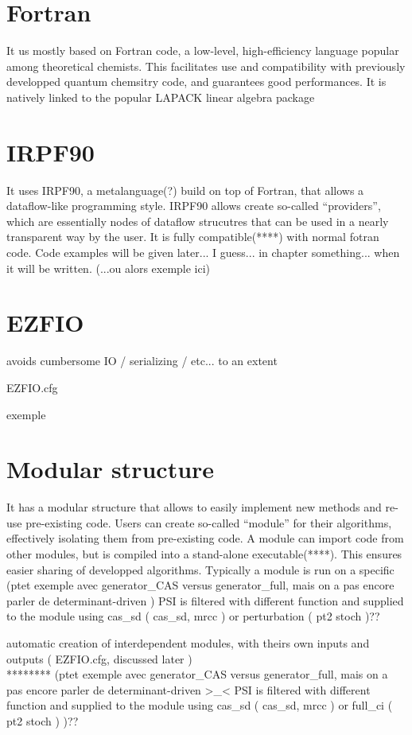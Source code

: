 \documentclass[./thesis.tex]{subfiles}
\begin{document}
\section{Fortran}
It us mostly based on Fortran code, a low-level, high-efficiency language popular among theoretical chemists. This facilitates use and compatibility with previously developped quantum chemsitry code, and guarantees good performances. It is natively linked to the popular LAPACK linear algebra package

\section{IRPF90}
It uses IRPF90, a metalanguage(?) build on top of Fortran, that allows a dataflow-like programming style.
IRPF90 allows create so-called ``providers'', which are essentially nodes of dataflow strucutres that can be used in a nearly transparent way by the user. It is fully compatible(****) with normal fotran code. Code examples will be given later... I guess... in chapter something... when it will be written.
(...ou alors exemple ici)


\section{EZFIO}


avoids cumbersome IO / serializing / etc... to an extent

EZFIO.cfg

exemple

\section{Modular structure}

It has a modular structure that allows to easily implement new methods and re-use pre-existing code.
Users can create so-called ``module'' for their algorithms, effectively isolating them from pre-existing code. A module can import code from other modules, but is compiled into a stand-alone executable(****). This ensures easier sharing of developped algorithms.
Typically a module is run on a specific 
(ptet exemple avec generator\_CAS versus generator\_full, mais on a pas encore parler de determinant-driven )
PSI is filtered with different function and supplied to the module using cas\_sd ( cas\_sd, mrcc ) or perturbation ( pt2 stoch )??

automatic creation of interdependent modules, with theirs own inputs and outputs ( EZFIO.cfg, discussed later ) \\
******** (ptet exemple avec generator\_CAS versus generator\_full, mais on a pas encore parler de determinant-driven >\_< PSI is filtered with different function and supplied to the module using cas\_sd ( cas\_sd, mrcc ) or full\_ci ( pt2 stoch ) )?? \\
\end{document}
